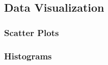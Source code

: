 \subsection{Data Visualization}

\subsubsection{Scatter Plots}

\subsubsection{Histograms}





\begin{comment}

- Maybe rename file to Rand_Statistics.tex

-descriptive vs inductive statistics
 descriptive: describes data that is available
 inductive: draws conclusions from sampled data about a general population



The 7 Levels of Statistics
https://www.youtube.com/watch?v=eg6N0i8NVxs


Degrees of Freedom, Actually Explained - The Geometry of Statistics | Ch. 1 (#SoME4)
https://www.youtube.com/watch?v=VDlnuO96p58


Population Statistics and Random Sampling
https://www.youtube.com/watch?v=OlkL1YatyHI


\end{comment}